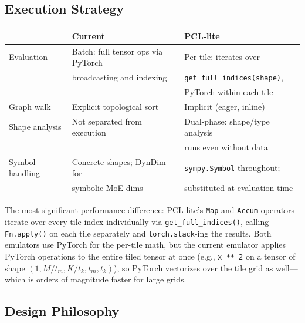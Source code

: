\documentclass[11pt]{article}
\begin{document}
\subsection{Execution Strategy}

\begin{center}
\begin{tabular}{lll}
\toprule
& \textbf{Current} & \textbf{PCL-lite} \\
\midrule
Evaluation & Batch: full tensor ops via PyTorch & Per-tile: iterates over \\
           & broadcasting and indexing          & \texttt{get\_full\_indices(shape)}, \\
           &                                    & PyTorch within each tile \\
Graph walk & Explicit topological sort           & Implicit (eager, inline) \\
Shape analysis & Not separated from execution   & Dual-phase: shape/type analysis \\
               &                                & runs even without data \\
Symbol handling & Concrete shapes; DynDim for     & \texttt{sympy.Symbol} throughout; \\
               & symbolic MoE dims               & substituted at evaluation time \\
\bottomrule
\end{tabular}
\end{center}

The most significant performance difference: PCL-lite's \texttt{Map} and \texttt{Accum} operators iterate over every tile index individually via \texttt{get\_full\_indices()}, calling \texttt{Fn.apply()} on each tile separately and \texttt{torch.stack}-ing the results.
Both emulators use PyTorch for the per-tile math, but the current emulator applies PyTorch operations to the entire tiled tensor at once (e.g., \texttt{x ** 2} on a tensor of shape $(1, M/t_m, K/t_k, t_m, t_k)$), so PyTorch vectorizes over the tile grid as well---which is orders of magnitude faster for large grids.

\subsection{Design Philosophy}
\end{document}
